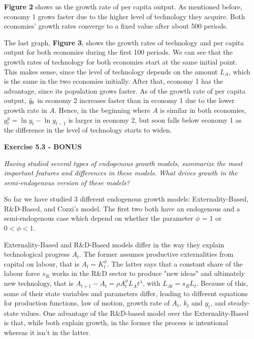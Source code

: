 \documentclass[11pt]{article} %
\begin{document}
\textbf{Figure 2} shows us the growth rate of per capita output. As mentioned before, economy 1 grows faster due to the higher level of technology they acquire. Both economies' growth rates converge to a fixed value after about 500 periods.\par

The last graph, \textbf{Figure 3}, shows the growth rates of technology and per capita output for both economies during the first 100 periods. We can see that the growth rates of technology for both economies start at the same initial point. This makes sense, since the level of technology depends on the amount $L_A$, which is the same in the two economies initially. After that, economy 1 has the advantage, since its population grows faster. As of the growth rate of per capita output, $\Tilde{y}_t$ in economy 2 increases faster than in economy 1 due to the lower growth rate in $A$. Hence, in the beginning where $A$ is similar in both economies, $g_t^y = \ln{y_t}-\ln{y_{t-1}}$ is larger in economy 2, but soon falls below economy 1 as the difference in the level of technology starts to widen.





\pagebreak
\textbf{\Large{Exercise 5.3 - BONUS}}

\textit{Having studied several types of endogenous growth models, summarize the most important features and differences in these models. What drives growth in the semi-endogenous version of these models?}\par 

So far we have studied 3 different endogenous growth models: Externality-Based, R\&D-Based, and Cozzi's model. The first two both have an endogenous and a semi-endogenous case which depend on whether the parameter $\phi$ = 1 or $0 < \phi < 1$.

\par Externality-Based and R\&D-Based models differ in the way they explain technological progress $A_t$. The former assumes productive externalities from capital on labour, that is $A_t = K_t^\phi$. The latter says that a constant share of the labour force $s_R$ works in the R\&D sector to produce "new ideas" and ultimately new technology, that is $A_{t+1} - A_t = \rho A_t^{\phi}L_At^\lambda$, with $L_{At} = s_{R}L_t$. Because of this, some of their state variables and parameters differ, leading to different equations for production functions, law of motion, growth rate of $A_t$, $k_t$ and $y_t$, and steady-state values. One advantage of the R\&D-based model over the Externality-Based is that, while both explain growth, in the former the process is intentional whereas it isn't in the latter.  
\end{document}
